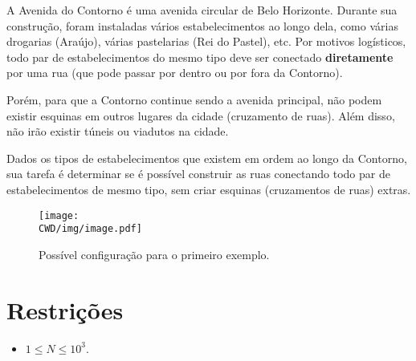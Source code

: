 %

A Avenida do Contorno é uma avenida circular de Belo Horizonte. Durante sua construção, foram instaladas vários estabelecimentos ao longo dela, como várias drogarias (Araújo), várias pastelarias (Rei do Pastel), etc. Por motivos logísticos, todo par de estabelecimentos do mesmo tipo deve ser conectado \textbf{diretamente} por uma rua (que pode passar por dentro ou por fora da Contorno).

Porém, para que a Contorno continue sendo a avenida principal, não podem existir esquinas em outros lugares da cidade (cruzamento de ruas). Além disso, não irão existir túneis ou viadutos na cidade.

Dados os tipos de estabelecimentos que existem em ordem ao longo da Contorno, sua tarefa é determinar se é possível construir as ruas conectando todo par de estabelecimentos de mesmo tipo, sem criar esquinas (cruzamentos de ruas) extras.

\begin{figure}[H]
  \centering
  \texttt{[image: \\CWD/img/image.pdf]}
  \caption{Possível configuração para o primeiro exemplo.}
\end{figure}

%
%

%
%


\section*{Restrições}

\begin{itemize}
\item $1 \leq N \leq 10^3$.
\end{itemize}


\sampleio
